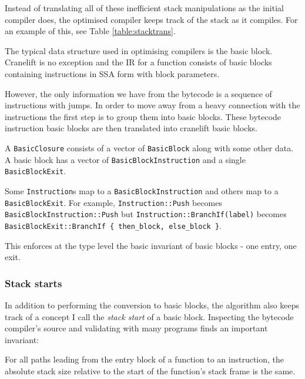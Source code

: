 Instead of translating all of these inefficient stack manipulations as the initial compiler does,
the optimised compiler keeps track of the stack as it compiles. For an example of this, see Table
\ref{table:stacktrans}.

\label{opt-bb}

The typical data structure used in optimising compilers is the basic block. Cranelift is no
exception and the IR for a function consists of basic blocks containing instructions in SSA form
with block parameters.

However, the only information we have from the bytecode is a sequence of instructions with jumps.
In order to move away from a heavy connection with the instructions the first step is to group them
into basic blocks. These bytecode instruction basic blocks are then translated into cranelift basic
blocks.


A \texttt{BasicClosure} consists of a vector of \texttt{BasicBlock} along with
some other data. A basic block has a vector of \texttt{BasicBlockInstruction} and a single
\texttt{BasicBlockExit}.

Some \texttt{Instruction}s map to a \texttt{BasicBlockInstruction} and others map to a
\texttt{BasicBlockExit}. For example, \texttt{Instruction::Push} becomes
\texttt{BasicBlockInstruction::Push} but \texttt{Instruction::BranchIf(label)} becomes
\texttt{BasicBlockExit::BranchIf \{ then\_block, else\_block \}}.

This enforces at the type level the basic invariant of basic blocks - one entry, one exit.

\subsubsection{Stack starts}

In addition to performing the conversion to basic blocks, the algorithm also keeps track of a
concept I call the \emph{stack start} of a basic block. Inspecting the bytecode compiler's source
and validating with many programs finds an important invariant:

\begin{framed}
      \noindent
      For all paths leading from the entry block of a function to an instruction, the absolute
      stack size
      relative to the start of the function's stack frame is the same.
\end{framed}

